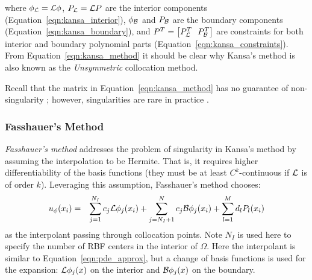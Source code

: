 \documentclass{report}
\begin{document}
{where $\phi_{\mathcal{L}} = \mathcal{L}\phi$, $P_{\mathcal{L}} = \mathcal{L}P$ are the interior components (Equation~\ref{eqn:kansa_interior}), $\phi_{\mathcal{B}}$ and $P_{\mathcal{B}}$ are the boundary components (Equation~\ref{eqn:kansa_boundary}), and $P^T = \left[P_\diffop{}^T \ \ P_\boundop{}^T\right]$ are constraints for both interior and boundary polynomial parts (Equation~\ref{eqn:kansa_constraints}). From Equation~\ref{eqn:kansa_method} it should be clear why Kansa's method is also known as the \emph{Unsymmetric} collocation method. 

Recall that the matrix in Equation~\ref{eqn:kansa_method} has no guarantee of non-singularity \cite{Fasshauer1997}; however, singularities are rare in practice \cite{Larsson2003}. 

\subsubsection{Fasshauer's Method}

\emph{Fasshauer's method} \cite{Fasshauer1997} addresses the problem of singularity in Kansa's method by assuming the interpolation to be Hermite. That is, it requires higher differentiability of the basis functions (they must be at least $C^k$-continuous if $\mathcal{L}$ is of order $k$). Leveraging this assumption, Fasshauer's method chooses: 
\begin{eqnarray}
u_\phi(x_i) & = & \sum_{j=1}^{N_I}  c_j \mathcal{L}\phi_j(x_i) + \sum_{j=N_{I} + 1}^{N} c_j \mathcal{B}\phi_j(x_i) + \sum_{l=1}^{M}d_l P_l(x_i)
\label{eqn:fasshauer_approx}
\end{eqnarray}
as the interpolant passing through collocation points. Note $N_I$ is used here to specify the number of RBF centers in the interior of $\Omega$. Here the interpolant is similar to Equation~\ref{eqn:pde_approx}, but a change of basis functions is used for the expansion: $\mathcal{L}\phi_j(x)$ on the interior and $\mathcal{B}\phi_j(x)$ on the boundary.

}
\end{document}
